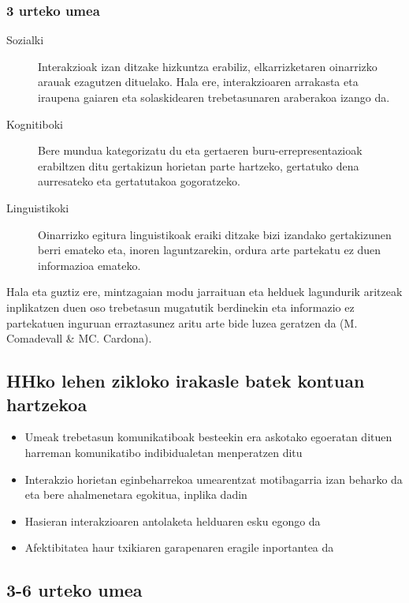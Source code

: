 \documentclass[
]{book}
\providecommand{\tightlist}{%
  \setlength{\itemsep}{0pt}\setlength{\parskip}{0pt}}
\begin{document}
\hypertarget{urteko-umea}{%
\subsubsection{3 urteko umea}\label{urteko-umea}}

\begin{description}
\item[Sozialki]
Interakzioak izan ditzake hizkuntza erabiliz, elkarrizketaren oinarrizko arauak ezagutzen dituelako. Hala ere, interakzioaren arrakasta eta iraupena gaiaren eta solaskidearen trebetasunaren araberakoa izango da.
\item[Kognitiboki]
Bere mundua kategorizatu du eta gertaeren buru-errepresentazioak erabiltzen ditu gertakizun horietan parte hartzeko, gertatuko dena aurresateko eta gertatutakoa gogoratzeko.
\item[Linguistikoki]
Oinarrizko egitura linguistikoak eraiki ditzake bizi izandako gertakizunen berri emateko eta, inoren laguntzarekin, ordura arte partekatu ez duen informazioa emateko.
\end{description}

Hala eta guztiz ere, mintzagaian modu jarraituan eta helduek lagundurik aritzeak inplikatzen duen oso trebetasun mugatutik berdinekin eta informazio ez partekatuen inguruan erraztasunez aritu arte bide luzea geratzen da (M. Comadevall \& MC. Cardona).

\hypertarget{hhko-lehen-zikloko-irakasle-batek-kontuan-hartzekoa}{%
\subsection{HHko lehen zikloko irakasle batek kontuan hartzekoa}\label{hhko-lehen-zikloko-irakasle-batek-kontuan-hartzekoa}}

\begin{itemize}
\tightlist
\item
  Umeak trebetasun komunikatiboak besteekin era askotako egoeratan dituen harreman komunikatibo indibidualetan menperatzen ditu
\item
  Interakzio horietan eginbeharrekoa umearentzat motibagarria izan beharko da eta bere ahalmenetara egokitua, inplika dadin
\item
  Hasieran interakzioaren antolaketa helduaren esku egongo da
\item
  Afektibitatea haur txikiaren garapenaren eragile inportantea da
\end{itemize}

\hypertarget{urteko-umea-1}{%
\subsection{3-6 urteko umea}\label{urteko-umea-1}}
\end{document}
